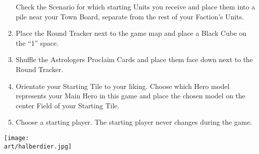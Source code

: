 \begin{multicols*}{2}
\begin{enumerate}
    Check the Scenario for which starting Units you receive and place them into a pile near your Town Board, separate from the rest of your Faction’s Units.
  \item Place the Round Tracker next to the game map and place a Black Cube on the ``1'' space.
  \item Shuffle the Astrologers Proclaim Cards and place them face down next to the Round Tracker.
  \item Orientate your Starting Tile to your liking.
    Choose which Hero model represents your Main Hero in this game and place the chosen model on the center Field of your Starting Tile.
  \item Choose a starting player. The starting player never changes during the game.
\end{enumerate}

\texttt{[image: \\art/halberdier.jpg]}

\vspace*{\fill}

\end{multicols*}
